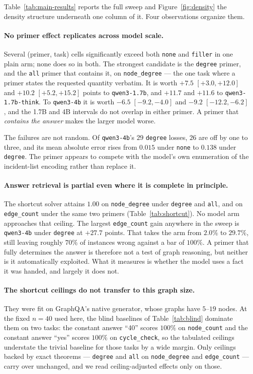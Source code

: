 \documentclass[11pt]{article}
\begin{document}
Table~\ref{tab:main-results} reports the full sweep and
Figure~\ref{fig:density} the density structure underneath one column of it.
Four observations organize them.

\paragraph{No primer effect replicates across model scale.} Several
(primer, task) cells significantly exceed both \texttt{none} and
\texttt{filler} in one plain arm; none does so in both. The strongest
candidate is the \texttt{degree} primer, and the \texttt{all} primer that
contains it, on \texttt{node\_degree} --- the one task where a primer
states the requested quantity verbatim. It is worth $+7.5$ $[+3.0, +12.0]$
and $+10.2$ $[+5.2, +15.2]$ points to \texttt{qwen3-1.7b}, and $+11.7$ and
$+11.6$ to \texttt{qwen3-1.7b-think}. To \texttt{qwen3-4b} it is worth
$-6.5$ $[-9.2, -4.0]$ and $-9.2$ $[-12.2, -6.2]$, and the 1.7B and 4B
intervals do not overlap in either primer. A primer that \emph{contains the
answer} makes the larger model worse.

The failures are not random. Of \texttt{qwen3-4b}'s $29$ \texttt{degree}
losses, $26$ are off by one to three, and its mean absolute error rises
from $0.015$ under \texttt{none} to $0.138$ under \texttt{degree}. The
primer appears to compete with the model's own enumeration of the
incident-list encoding rather than replace it.

\paragraph{Answer retrieval is partial even where it is complete in
principle.} The shortcut solver attains $1.00$ on \texttt{node\_degree}
under \texttt{degree} and \texttt{all}, and on \texttt{edge\_count} under
the same two primers (Table~\ref{tab:shortcut}). No model arm approaches
that ceiling. The largest \texttt{edge\_count} gain anywhere in the sweep
is \texttt{qwen3-4b} under \texttt{degree} at $+27.7$ points. That takes the
arm from $2.0\%$ to $29.7\%$, still leaving roughly $70\%$ of instances
wrong against a bar of $100\%$. A primer that fully determines the answer
is therefore not a test of graph reasoning, but neither is it automatically
exploited. What it measures is whether the model uses a fact it was handed,
and largely it does not.

\paragraph{The shortcut ceilings do not transfer to this graph size.} They
were fit on GraphQA's native generator, whose graphs have $5$--$19$ nodes.
At the fixed $n{=}40$ used here, the blind baselines of
Table~\ref{tab:blind} dominate them on two tasks: the constant answer
``40'' scores $100\%$ on \texttt{node\_count} and the constant answer
``yes'' scores $100\%$ on \texttt{cycle\_check}, so the tabulated ceilings
understate the trivial baseline for those tasks by a wide margin. Only
ceilings backed by exact theorems --- \texttt{degree} and \texttt{all} on
\texttt{node\_degree} and \texttt{edge\_count} --- carry over unchanged,
and we read ceiling-adjusted effects only on those.
\end{document}
